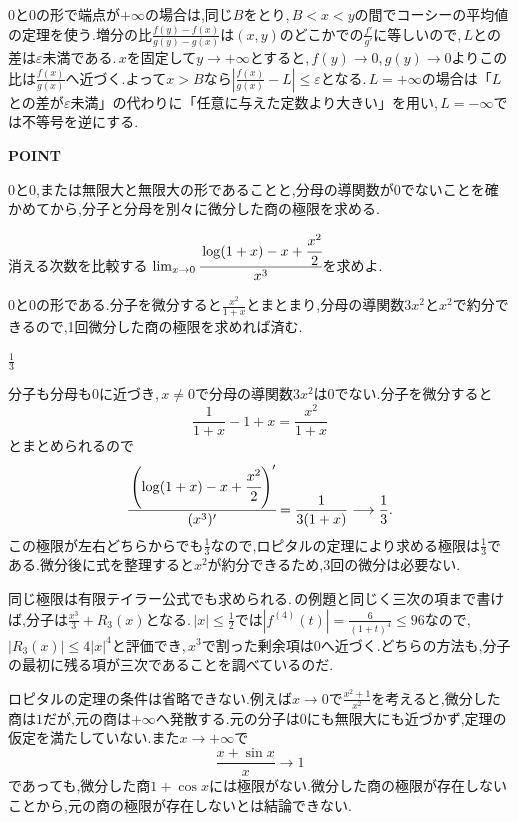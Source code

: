 $0$と$0$の形で端点が$+\infty$の場合は,同じ$B$をとり,\,$B<x<y$の間でコーシーの平均値の定理を使う.増分の比$\frac{f(y)-f(x)}{g(y)-g(x)}$は$(x,y)$のどこかでの$\frac{f'}{g'}$に等しいので,\,$L$との差は$\varepsilon$未満である.\,$x$を固定して$y\to+\infty$とすると,\,$f(y)\to0$,\,$g(y)\to0$よりこの比は$\frac{f(x)}{g(x)}$へ近づく.よって$x>B$なら$\left|\frac{f(x)}{g(x)}-L\right|\le\varepsilon$となる.\,$L=+\infty$の場合は「$L$との差が$\varepsilon$未満」の代わりに「任意に与えた定数より大きい」を用い,\,$L=-\infty$では不等号を逆にする.

\begin{bookpoint}
\textbf{POINT}\par
$0$と$0$,または無限大と無限大の形であることと,分母の導関数が$0$でないことを確かめてから,分子と分母を別々に微分した商の極限を求める.
\end{bookpoint}

\begin{example}{消える次数を比較する}
$\lim_{x\to0}\cfrac{\log(1+x)-x+\cfrac{x^2}{2}}{x^3}$を求めよ.
\end{example}

$0$と$0$の形である.分子を微分すると$\frac{x^2}{1+x}$とまとまり,分母の導関数$3x^2$と$x^2$で約分できるので,1回微分した商の極限を求めれば済む.

$\frac13$

分子も分母も$0$に近づき,\,$x\ne0$で分母の導関数$3x^2$は$0$でない.分子を微分すると
\[
 \frac1{1+x}-1+x=\frac{x^2}{1+x}
\]
とまとめられるので
\[
 \cfrac{\left(\log(1+x)-x+\cfrac{x^2}{2}\right)'}{(x^3)'}
 =\frac1{3(1+x)}\longrightarrow\frac13.
\]
この極限が左右どちらからでも$\frac13$なので,ロピタルの定理により求める極限は$\frac13$である.微分後に式を整理すると$x^2$が約分できるため,3回の微分は必要ない.

同じ極限は有限テイラー公式でも求められる.\,の例題と同じく三次の項まで書けば,分子は$\frac{x^3}{3}+R_3(x)$となる.\,$|x|\le\frac12$では$|f^{(4)}(t)|=\frac6{(1+t)^4}\le96$なので,\,$|R_3(x)|\le4|x|^4$と評価でき,\,$x^3$で割った剰余項は$0$へ近づく.どちらの方法も,分子の最初に残る項が三次であることを調べているのだ.

ロピタルの定理の条件は省略できない.例えば$x\to0$で$\frac{x^2+1}{x^2}$を考えると,微分した商は$1$だが,元の商は$+\infty$へ発散する.元の分子は$0$にも無限大にも近づかず,定理の仮定を満たしていない.また$x\to+\infty$で
\[
 \frac{x+\sin x}{x}\longrightarrow1
\]
であっても,微分した商$1+\cos x$には極限がない.微分した商の極限が存在しないことから,元の商の極限が存在しないとは結論できない.
